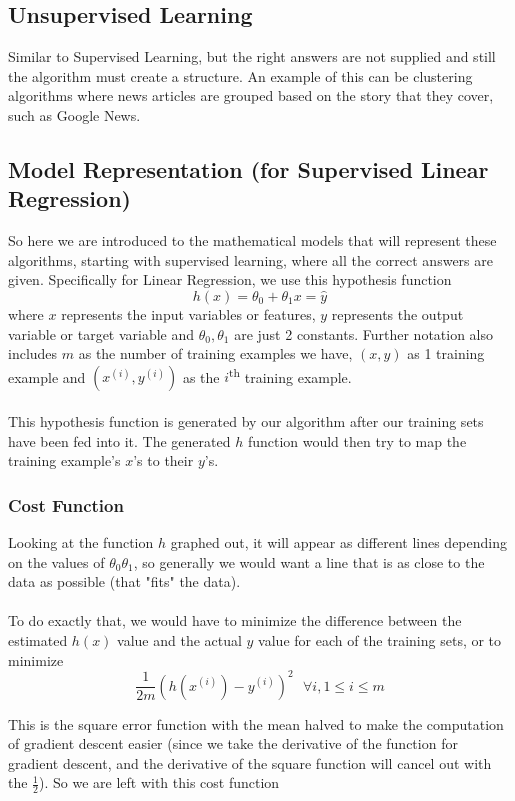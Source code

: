 \documentclass[12pt]{article}
\newcommand{\ts}{\textsuperscript}
\begin{document}
\subsection{Unsupervised Learning}

Similar to Supervised Learning, but the right answers are not supplied and still the algorithm must create a structure. An example of this can be clustering algorithms where news articles are grouped based on the story that they cover, such as Google News.

\subsection{Model Representation (for Supervised Linear Regression)}

So here we are introduced to the mathematical models that will represent these algorithms, starting with supervised learning, where all the correct answers are given. Specifically for Linear Regression, we use this hypothesis function $$h(x) = \theta_0 + \theta_1 x = \hat{y}$$ where $x$ represents the input variables or features, $y$ represents the output variable or target variable and $\theta_0, \theta_1$ are just 2 constants. Further notation also includes $m$ as the number of training examples we have, $(x,y)$ as 1 training example and $(x^{(i)},y^{(i)})$ as the $i$\ts{th} training example.\\
\\
This hypothesis function is generated by our algorithm after our training sets have been fed into it. The generated $h$ function would then try to map the training example's $x$'s to their $y$'s.

\subsubsection{Cost Function}

Looking at the function $h$ graphed out, it will appear as different lines depending on the values of $\theta_0 \theta_1$, so generally we would want a line that is as close to the data as possible (that "fits" the data).\\
\\
To do exactly that, we would have to minimize the difference between the estimated $h(x)$ value and the actual $y$ value for each of the training sets, or to minimize
$$\frac{1}{2m} (h(x^{(i)}) - y^{(i)})^2\:\:\: \forall i, 1 \leq i \leq m$$

This is the square error function with the mean halved to make the computation of gradient descent easier (since we take the derivative of the function for gradient descent, and the derivative of the square function will cancel out with the $\frac{1}{2}$). So we are left with this cost function
\end{document}
